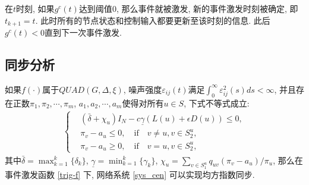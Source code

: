         \begin{rem}
        在$t$时刻, 如果$g^c(t)$达到阈值$0$, 那么事件就被激发, 新的事件激发时刻被确定, 即$t_{k+1}=t$. 此时所有的节点状态和控制输入都要更新至该时刻的信息. 此后$g^c(t)<0$直到下一次事件激发.
        \end{rem}
\subsection{同步分析}
        \begin{thm}\label{thm:cen}
            如果$f(\cdot)$属于$QUAD(G,\Delta,\xi)$, 噪声强度$\varepsilon_{ij}(t)$满足$\int_0^\infty\varepsilon_{ij}^2(s)ds<\infty$, 并且存在正数$\pi_1,\pi_2,\cdots,\pi_m$, $a_1,a_2,\cdots,a_m$使得对所有$u\in S$, 下式不等式成立:
            \begin{align}\label{ce-condiction}
            \left\{
            \begin{aligned}
                  &(\bar{\delta}+\chi_u)I_N-c\underline{\gamma}(L(u)+\epsilon D(u))\leq0,\\
                  &\pi_v-a_u\leq0, \quad \text{if}\quad v\neq u, v\in S^u_2,\\
                  &\pi_v-a_u\geq0, \quad \text{if} \quad v= u, v\in S^u_2,
            \end{aligned}
            \right.
            \end{align}
           其中$\bar{\delta}=\max_{k=1}^k\{\delta_k\}$, $\underline{\gamma}=\min_{k=1}^k\{\gamma_k\}$, $\chi_u=\sum_{v\in S_1^u}q_{uv}(\pi_v-a_u)/\pi_u$, 那么在事件激发函数 \eqref{trig-f} 下, 网络系统 \eqref{sys_cen} 可以实现均方指数同步.
        \end{thm}
